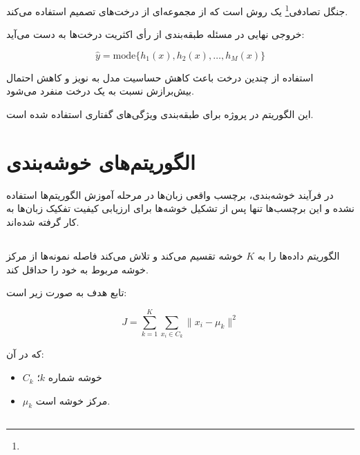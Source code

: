 جنگل تصادفی\footnote{} یک روش
است که از مجموعه‌ای از درخت‌های تصمیم استفاده می‌کند.

خروجی نهایی در مسئله طبقه‌بندی از رأی اکثریت درخت‌ها به دست می‌آید:

\begin{equation}
\hat{y}
=
\mathrm{mode}
\{
h_1(x),
h_2(x),
\ldots,
h_M(x)
\}
\end{equation}

استفاده از چندین درخت باعث کاهش حساسیت مدل به نویز و کاهش احتمال بیش‌برازش نسبت به یک درخت منفرد می‌شود.

این الگوریتم در پروژه برای طبقه‌بندی ویژگی‌های گفتاری استفاده شده است.


\section{الگوریتم‌های خوشه‌بندی}

در فرآیند خوشه‌بندی، برچسب واقعی زبان‌ها در مرحله آموزش الگوریتم‌ها استفاده نشده و این برچسب‌ها تنها پس از تشکیل خوشه‌ها برای ارزیابی کیفیت تفکیک زبان‌ها به کار گرفته شده‌اند.

\subsection{}

الگوریتم
داده‌ها را به $K$ خوشه تقسیم می‌کند و تلاش می‌کند فاصله نمونه‌ها از مرکز خوشه مربوط به خود را حداقل کند.

تابع هدف به صورت زیر است:

\begin{equation}
J
=
\sum_{k=1}^{K}
\sum_{x_i\in C_k}
\|x_i-\mu_k\|^2
\end{equation}

که در آن:

\begin{itemize}
	\item $C_k$ خوشه شماره $k$؛
	\item $\mu_k$ مرکز خوشه است.
\end{itemize}


\subsection{}

